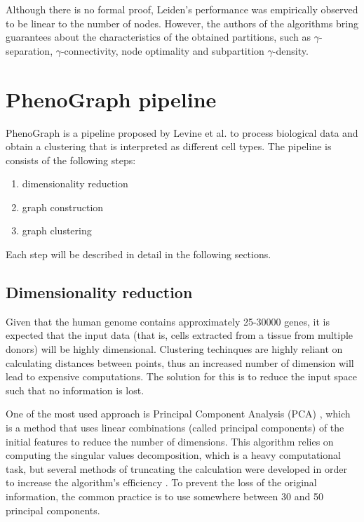 Although there is no formal proof, Leiden's performance was empirically observed to be linear to the number of nodes. However, the authors of the algorithms bring guarantees about the characteristics of the obtained partitions, such as $\gamma$-separation, $\gamma$-connectivity, node optimality and subpartition $\gamma$-density.

\section{PhenoGraph pipeline}
    PhenoGraph \cite{Levine2015} is a pipeline proposed by Levine et al. to process biological data and obtain a clustering that is interpreted as different cell types. The pipeline is consists of the following steps:
    \begin{enumerate}
        \item dimensionality reduction
        \item graph construction
        \item graph clustering
    \end{enumerate}

    Each step will be described in detail in the following sections.

    \subsection{Dimensionality reduction}
    Given that the human genome contains approximately 25-30000 genes, it is expected that the input data (that is, cells extracted from a tissue from multiple donors) will be highly dimensional. Clustering techinques are highly reliant on calculating distances between points, thus an increased number of dimension will lead to expensive computations. The solution for this is to reduce the input space such that no information is lost.
    
    One of the most used approach is Principal Component Analysis (PCA) \cite{WOLD198737}, which is a method that uses linear combinations (called principal components) of the initial features to reduce the number of dimensions. This algorithm relies on computing the singular values decomposition, which is a heavy computational task, but several methods of truncating the calculation were developed in order to increase the algorithm's efficiency \cite{Baglama2016IRLBAFP}. To prevent the loss of the original information, the common practice is to use somewhere between 30 and 50 principal components.

